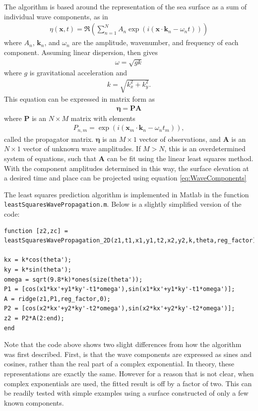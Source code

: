 \documentclass[11pt]{article}
\begin{document}
The algorithm is based around the representation of the sea surface as a sum of individual wave components, as in
\begin{eqnarray} \label{eq:WaveComponents}
\eta(\mathbf{x},t) = \Re \left(\sum_{n=1}^{N}A_n \exp(i(\mathbf{x}\cdot\mathbf{k}_n-\omega_nt))\right)
\end{eqnarray}
where $A_n$, $\mathbf{k}_n$, and $\omega_n$ are the amplitude, wavenumber, and frequency of each component.  Assuming linear dispersion, then gives
\begin{eqnarray}
\omega = \sqrt{gk}
\end{eqnarray}
where $g$ is gravitational acceleration and 
\begin{eqnarray}
k=\sqrt{k_x^2+k_y^2}.  
\end{eqnarray}
This equation can be expressed in matrix form as
\begin{eqnarray}
\mathbf{\eta} = \mathbf{P}\mathbf{A}
\end{eqnarray}
where $\mathbf{P}$ is an $N\times M$ matrix with elements
\begin{eqnarray}
P_{n,m} = \exp(i(\mathbf{x}_m\cdot\mathbf{k}_n-\omega_n t_m)),
\end{eqnarray}
called the propagator matrix.  $\mathbf{\eta}$ is an $M\times1$ vector of observations, and $\mathbf{A}$ is an $N\times1$ vector of unknown wave amplitudes.  If $M>N$, this is an overdetermined system of equations, such that $\mathbf{A}$ can be fit using the linear least squares method.  With the component amplitudes determined in this way, the surface elevation at a desired time and place can be projected using equation \ref{eq:WaveComponents}

The least squares prediction algorithm is implemented in Matlab in the function \texttt{\\leastSquaresWavePropagation.m}.  Below is a slightly simplified version of the code:

\lstset{language=Matlab}
 \begin{lstlisting}
function [z2,zc] = leastSquaresWavePropagation_2D(z1,t1,x1,y1,t2,x2,y2,k,theta,reg_factor)

kx = k*cos(theta');
ky = k*sin(theta');
omega = sqrt(9.8*k)*ones(size(theta'));
P1 = [cos(x1*kx'+y1*ky'-t1*omega'),sin(x1*kx'+y1*ky'-t1*omega')];
A = ridge(z1,P1,reg_factor,0);
P2 = [cos(x2*kx'+y2*ky'-t2*omega'),sin(x2*kx'+y2*ky'-t2*omega')];
z2 = P2*A(2:end);
end
 \end{lstlisting}

Note that the code above shows two slight differences from how the algorithm was first described.  First, is that the wave components are expressed as sines and cosines, rather than the real part of a complex exponential.  In theory, these representations are exactly the same.  However for a reason that is not clear, when complex exponentials are used, the fitted result is off by a factor of two.  This can be readily tested with simple examples using a surface constructed of only a few known components.
\end{document}
